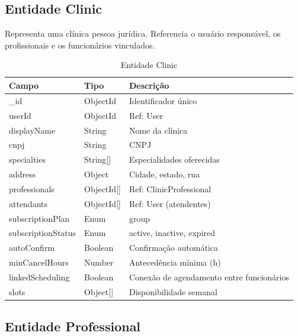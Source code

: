 \subsection{Entidade Clinic}
\label{subsec:entity-clinic}

Representa uma clínica pessoa jurídica. Referencia
o usuário responsável, os profissionais e os
funcionários vinculados.

\begin{table}[H]
  \centering
  \caption{Entidade Clinic}
  \label{tab:entity-clinic}
  \begin{tabular}{p{3cm}p{3cm}p{5.5cm}}
    \toprule
    \textbf{Campo} &
    \textbf{Tipo} &
    \textbf{Descrição} \\
    \midrule
    \_id               & ObjectId   & Identificador único \\
    userId             & ObjectId   & Ref: User \\
    displayName        & String     & Nome da clínica \\
    cnpj               & String     & CNPJ \\
    specialties        & String[]   & Especialidades oferecidas \\
    address            & Object     & Cidade, estado, rua \\
    professionals      & ObjectId[] & Ref: ClinicProfessional \\
    attendants         & ObjectId[] & Ref: User (atendentes) \\
    subscriptionPlan   & Enum       & group \\
    subscriptionStatus & Enum       & active, inactive, expired \\
    autoConfirm        & Boolean    & Confirmação automática \\
    minCancelHours     & Number     & Antecedência mínima (h) \\
    linkedScheduling   & Boolean    & Conexão de agendamento
                                      entre funcionários \\
    slots              & Object[]   & Disponibilidade semanal \\
    \bottomrule
  \end{tabular}
\end{table}

\subsection{Entidade Professional}
\label{subsec:entity-professional}

